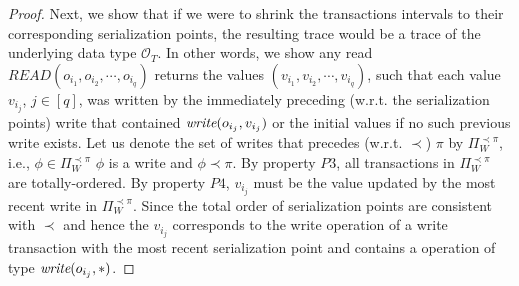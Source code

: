 \begin{proof}
Next, we show that 
if we were to shrink  the transactions intervals to  their corresponding serialization points, the 
 resulting  trace would be a trace of the underlying data type $\mathcal{O}_T$. 
In other words, we show any {\sc read}
$READ(o_{i_1}, o_{i_2}, \cdots, o_{i_q})$
returns the  values   $(v_{i_1}, v_{i_2}, \cdots, v_{i_q})$, such that each value
$v_{i_j}$, $j \in [q]$,  was written by the immediately preceding  (w.r.t. the serialization points)  {\sc 
write} that contained  ${ \textit{write}( o_{i_j}, v_{i_j}) }$ or the initial values if no such previous {\sc write} exists.
%
Let us denote the set of {\sc write}s that precedes (w.r.t. $\prec$) $\pi$ by $\Pi_W^{\prec\pi}$, i.e., 
$\phi \in \Pi^{\prec\pi}_W$  $\phi$ is a write and $\phi \prec \pi$.  By property $P3$, all transactions in 
$\Pi_{W}^{\prec\pi}$ are totally-ordered.  By property $P4$,  $v_{i_j}$ must be the value updated by
 the most recent {\sc write} in $\Pi_W^{\prec\pi}$.  Since the total order of serialization points are  consistent with 
 $\prec$ and hence the $v_{i_j}$ corresponds to the write operation of a {\sc write} transaction with 
  the most recent serialization point and  contains a operation of  type ${ \textit{write}( o_{i_j}, *) }$.
\end{proof}

